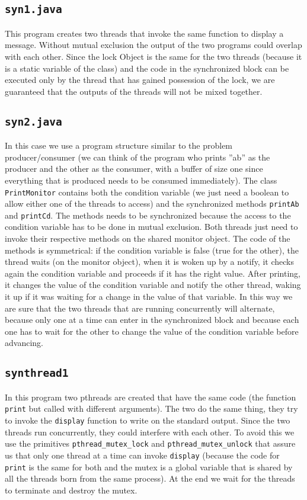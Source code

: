 \subsection{\texttt{syn1.java}}
This program creates two threads that invoke the same function to display a message. Without mutual exclusion the output of the two programs could overlap with each other. Since the lock Object is the same for the two threads (because it is a static variable of the class) and the code in the synchronized block can be executed only by the thread that has gained possession of the lock, we are guaranteed that the outputs of the threads will not be mixed together.
\subsection{\texttt{syn2.java}}
In this case we use a program structure similar to the problem producer/consumer (we can think of the program who prints ''ab'' as the producer and the other as the consumer, with a buffer of size one since everything that is produced needs to be consumed immediately). \newline
The class \texttt{PrintMonitor} contains both the condition variable (we just need a boolean to allow either one of the threads to access) and the synchronized methods \texttt{printAb} and \texttt{printCd}. The methods needs to be synchronized because the access to the condition variable has to be done in mutual exclusion. \newline
Both threads just need to invoke their respective methods on the shared monitor object. The code of the methods is symmetrical: if the condition variable is false (true for the other), the thread waits (on the monitor object), when it is woken up by a notify, it checks again the condition variable and proceeds if it has the right value. After printing, it changes the value of the condition variable and notify the other thread, waking it up if it was waiting for a change in the value of that variable. In this way we are sure that the two threads that are running concurrently will alternate, because only one at a time can enter in the synchronized block and because each one has to wait for the other to change the value of the condition variable before advancing.
\subsection{\texttt{synthread1}}
In this program two pthreads are created that have the same code (the function \texttt{print} but called with different arguments). The two do the same thing, they try to invoke the \texttt{display} function to write on the standard output. Since the two threads run concurrently, they could interfere with each other. To avoid this we use the primitives \texttt{pthread\_mutex\_lock} and \texttt{pthread\_mutex\_unlock} that assure us that only one thread at a time can invoke \texttt{display} (because the code for \texttt{print} is the same for both and the mutex is a global variable that is shared by all the threads born from the same process). At the end we wait for the threads to terminate and destroy the mutex.
